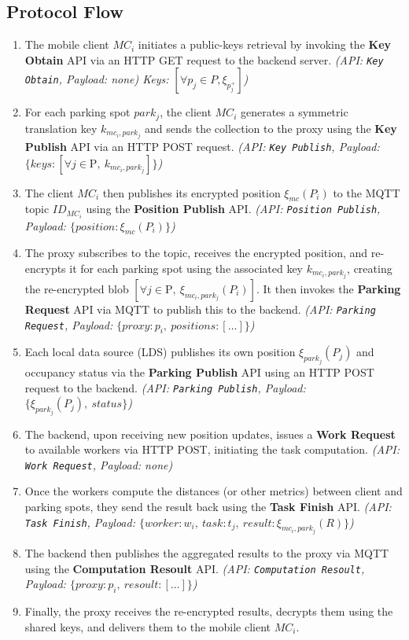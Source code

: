 \documentclass[12pt,a4paper,twoside]{book}
\begin{document}
\subsection{Protocol Flow}
\begin{enumerate}
    \item The mobile client $MC_i$ initiates a public-keys retrieval by invoking the \textbf{Key Obtain} API via an HTTP GET request to the backend server. \emph{(API: \texttt{Key Obtain}, Payload: none) \to Keys: $[\forall p_j \in P, \xi_{p_j^+}]$)}
    \item For each parking spot $park_j$, the client $MC_i$ generates a symmetric translation key $k_{mc_i, park_j}$ and sends the collection to the proxy using the \textbf{Key Publish} API via an HTTP POST request. \emph{(API: \texttt{Key Publish}, Payload: $\{keys: [\forall j \in \text{P},\ k_{mc_i, park_j}]\}$)}
    \item The client $MC_i$ then publishes its encrypted position $\xi_{mc}(P_i)$ to the MQTT topic $ID_{MC_i}$ using the \textbf{Position Publish} API. \emph{(API: \texttt{Position Publish}, Payload: $\{position: \xi_{mc}(P_i)\}$)}
    \item The proxy subscribes to the topic, receives the encrypted position, and re-encrypts it for each parking spot using the associated key $k_{mc_i, park_j}$, creating the re-encrypted blob $[\forall j \in \text{P},\ \xi_{mc_i, park_j}(P_i)]$. It then invokes the \textbf{Parking Request} API via MQTT to publish this to the backend. \emph{(API: \texttt{Parking Request}, Payload: $\{proxy: p_i,\ positions: [\ldots]\}$)}
    \item Each local data source (LDS) publishes its own position $\xi_{park_j}(P_j)$ and occupancy status via the \textbf{Parking Publish} API using an HTTP POST request to the backend. \emph{(API: \texttt{Parking Publish}, Payload: $\{\xi_{park_j}(P_j),\ status\}$)}
    \item The backend, upon receiving new position updates, issues a \textbf{Work Request} to available workers via HTTP POST, initiating the task computation. \emph{(API: \texttt{Work Request}, Payload: none)}
    \item Once the workers compute the distances (or other metrics) between client and parking spots, they send the result back using the \textbf{Task Finish} API. \emph{(API: \texttt{Task Finish}, Payload: $\{worker: w_i,\ task: t_j,\ result: \xi_{mc_i, park_j}(R)\}$)}
    \item The backend then publishes the aggregated results to the proxy via MQTT using the \textbf{Computation Resoult} API. \emph{(API: \texttt{Computation Resoult}, Payload: $\{proxy: p_i,\ resoult: [\ldots]\}$)}
    \item Finally, the proxy receives the re-encrypted results, decrypts them using the shared keys, and delivers them to the mobile client $MC_i$.
\end{enumerate}
\end{document}
